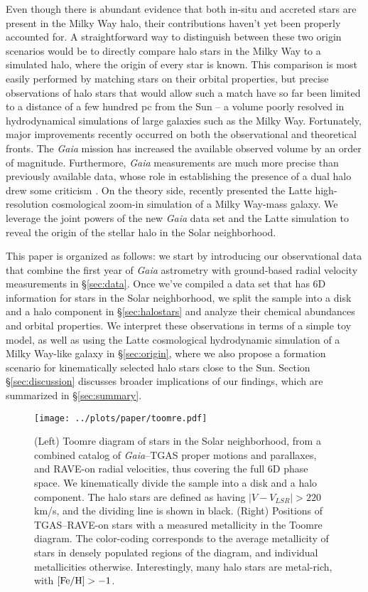 \documentclass[apj, twocolappendix, numberedappendix, appendixfloats]{emulateapj}
\begin{document}
Even though there is abundant evidence that both in-situ and accreted stars are present in the Milky Way halo, their contributions haven't yet been properly accounted for.
A straightforward way to distinguish between these two origin scenarios would be to directly compare halo stars in the Milky Way to a simulated halo, where the origin of every star is known.
This comparison is most easily performed by matching stars on their orbital properties, but precise observations of halo stars that would allow such a match have so far been limited to a distance of a few hundred pc from the Sun -- a volume poorly resolved in hydrodynamical simulations of large galaxies such as the Milky Way.
Fortunately, major improvements recently occurred on both the observational and theoretical fronts.
The \emph{Gaia} mission \citep{perryman2001} has increased the available observed volume by an order of magnitude.
Furthermore, \emph{Gaia} measurements are much more precise than previously available data, whose role in establishing the presence of a dual halo drew some criticism \citep{schonrich2011, schonrich2014}.
On the theory side, \citet{wetzel2016} recently presented the Latte high-resolution cosmological zoom-in simulation of a Milky Way-mass galaxy.
We leverage the joint powers of the new \emph{Gaia} data set and the Latte simulation to reveal the origin of the stellar halo in the Solar neighborhood.

This paper is organized as follows: we start by introducing our observational data that combine the first year of \emph{Gaia} astrometry with ground-based radial velocity measurements in \S\ref{sec:data}.
Once we've compiled a data set that has 6D information for stars in the Solar neighborhood, we split the sample into a disk and a halo component in \S\ref{sec:halostars} and analyze their chemical abundances and orbital properties.
We interpret these observations in terms of a simple toy model, as well as using the Latte cosmological hydrodynamic simulation of a Milky Way-like galaxy in \S\ref{sec:origin}, where we also propose a formation scenario for kinematically selected halo stars close to the Sun.
Section \S\ref{sec:discussion} discusses broader implications of our findings, which are summarized in \S\ref{sec:summary}.


\begin{figure*}
\begin{center}
\texttt{[image: ../plots/paper/toomre.pdf]}
\caption{(Left) Toomre diagram of stars in the Solar neighborhood, from a combined catalog of \emph{Gaia}--TGAS proper motions and parallaxes, and RAVE-on radial velocities, thus covering the full 6D phase space.
We kinematically divide the sample into a disk and a halo component.
The halo stars are defined as having $|V-V_{LSR}|>220$\,km/s, and the dividing line is shown in black.
(Right) Positions of TGAS--RAVE-on stars with a measured metallicity in the Toomre diagram.
The color-coding corresponds to the average metallicity of stars in densely populated regions of the diagram, and individual metallicities otherwise.
Interestingly, many halo stars are metal-rich, with $\rm[Fe/H]>-1$.}
\label{fig:toomre}
\end{center}
\end{figure*}
\end{document}
